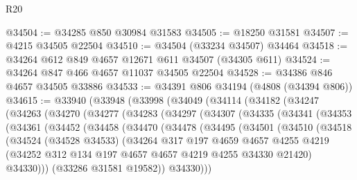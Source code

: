 \begin{lexlean}{R20}
\begin{coremodule}
@34504 := @34285 @850 @30984 @31583
@34505 := @18250 @31581
@34507 := @4215 @34505 @22504
@34510 := @34504 (@33234 @34507) @34464
@34518 := @34264 @612 @849 @4657 @12671 @611 @34507 (@34305 @611)
@34524 := @34264 @847 @466 @4657 @11037 @34505 @22504
@34528 := @34386 @846 @4657 @34505 @33886
@34533 := @34391 @806 @34194 (@4808 (@34394 @806))
@34615 := @33940
    (@33948
      (@33998
        (@34049
          (@34114
            (@34182
              (@34247
                (@34263
                  (@34270
                    (@34277
                      (@34283
                        (@34297
                          (@34307
                            (@34335
                              (@34341
                                (@34353
                                  (@34361
                                    (@34452
                                      (@34458
                                        (@34470
                                          (@34478
                                            (@34495
                                              (@34501
                                                (@34510
                                                  (@34518
                                                    (@34524
                                                      (@34528 @34533)
                                                      (@34264
                                                        @317
                                                        @197
                                                        @4659
                                                        @4657
                                                        @4255
                                                        @4219
                                                        (@34252
                                                          @312
                                                          @134
                                                          @197
                                                          @4657
                                                          @4657
                                                          @4219
                                                          @4255
                                                          @34330
                                                          @21420)
                                                        @34330)))
                                                  (@33286 @31581 @19582))
                                                @34330)))

\end{coremodule}
\end{lexlean}
